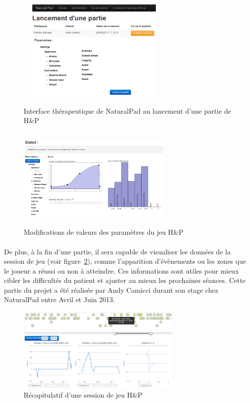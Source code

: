 \begin{figure}[!hbtp]
	\begin{minipage}{0.5\linewidth}	
		\centering
		\includegraphics[width=7.5cm, height=5cm]{images/interface_accueil.png}
		\caption{Interface thérapeutique de NaturalPad au lancement d'une partie de H\&P }
		\label{interface_accueil}
	\end{minipage}	
	\begin{minipage}{0.5\linewidth}	
		\centering
		\includegraphics[width=7.5cm, height=5cm]{images/interface_parametres.png}
		\caption{Modifications de valeurs des paramètres du jeu H\&P}
		\label{interface_parametres}
	\end{minipage}
\end{figure}
\paragraph{} De plus, à la fin d'une partie, il sera capable de visualiser les données de la session de jeu (voir figure~\ref{interface_recap}), comme l'apparition d'évènements ou les zones que le joueur a réussi ou non à atteindre. Ces informations sont utiles pour mieux cibler les difficultés du patient et ajuster au mieux les prochaines séances. Cette partie du projet a été réalisée par Andy Camicci durant son stage chez NaturalPad entre Avril et Juin 2013.
\begin{figure}[!hbtp]
	\centering
		\includegraphics[width=8cm]{images/interface_recap.png}
		\caption{Récapitulatif d'une session de jeu H\&P}
		\label{interface_recap}
\end{figure}


